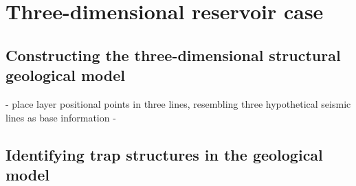 \chapter{Three-dimensional reservoir case}

	\section{Constructing the three-dimensional structural geological model}
	- place layer positional points in three lines, resembling three hypothetical seismic lines as base information
	-  
	
	\section{Identifying trap structures in the geological model}